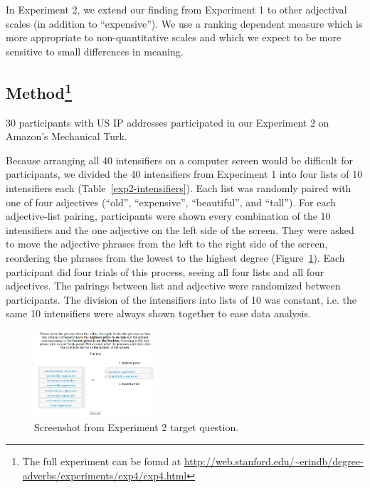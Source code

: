 \documentclass[10pt,letterpaper]{article}
\begin{document}
In Experiment 2, we extend our finding from Experiment 1 to other adjectival scales (in addition to ``expensive''). We use a ranking dependent measure which is more appropriate to non-quantitative scales and which we expect to be more sensitive to small differences in meaning.

\subsection{Method\footnote{The full experiment can be found at \url{http://web.stanford.edu/~erindb/degree-adverbs/experiments/exp4/exp4.html}}}

30 participants with US IP addresses participated in our Experiment 2 on Amazon's Mechanical Turk.

Because arranging all 40 intensifiers on a computer screen would be difficult for participants, we divided the 40 intensifiers from Experiment 1 into four lists of 10 intensifiers each (Table~\ref{exp2-intensifiers}).
Each list was randomly paired with one of four adjectives (``old'', ``expensive'', ``beautiful'', and ``tall'').
For each adjective-list pairing, participants were shown every combination of the 10 intensifiers and the one adjective on the left side of the screen.
They were asked to move the adjective phrases from the left to the right side of the screen, reordering the phrases from the lowest to the highest degree (Figure~\ref{exp2-q}).
Each participant did four trials of this process, seeing all four lists and all four adjectives.
The pairings between list and adjective were randomized between participants.
The division of the intensifiers into lists of 10 was constant, i.e. the same 10 intensifiers were always shown together to ease data analysis.

\begin{figure}[ht]
\begin{center}
\includegraphics[width=0.4\textwidth]{analysis_files_for_writeup/images/exp2-q.png}
\end{center}
\caption{Screenshot from Experiment 2 target question.} 
\label{exp2-q}
\end{figure}
\end{document}
